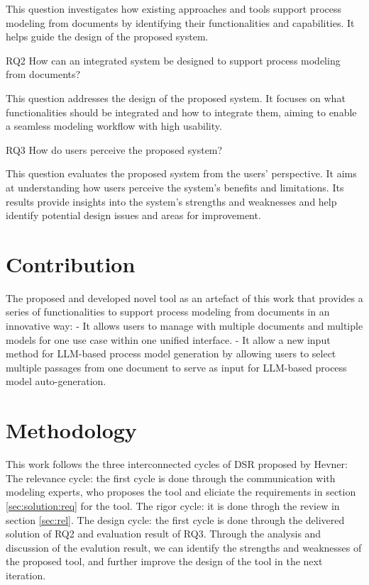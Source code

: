 This question investigates how existing approaches and tools support process modeling from documents by identifying their functionalities and capabilities. It helps guide the design of the proposed system.

RQ2 How can an integrated system be designed to support process modeling from documents?

This question addresses the design of the proposed system. It focuses on what functionalities should be integrated and how to integrate them, aiming to enable a seamless modeling workflow with high usability.

RQ3 How do users perceive the proposed system?

This question evaluates the proposed system from the users’ perspective. It aims at understanding how users perceive the system’s benefits and limitations. Its results provide insights into the system’s strengths and weaknesses and help identify potential design issues and areas for improvement.


\section{Contribution}
\label{sec:intro:con}
The proposed and developed novel tool as an artefact of this work that provides a series of functionalities to support process modeling from documents in an innovative way:
- It allows users to manage with multiple documents and multiple models for one use case within one unified interface.
- It allow a new input method for LLM-based process model generation by allowing users to select multiple passages from one document to serve as input for LLM-based process model auto-generation.
\section{Methodology}
\label{sec:intro:meth}

This work follows the three interconnected cycles of DSR \cite{hevner2007} proposed by Hevner:
The relevance cycle: the first cycle is done through the communication with modeling experts, who proposes the tool and eliciate the requirements in section \ref{sec:solution:req} for the tool. 
The rigor cycle: it is done throgh the review in section \ref{sec:rel}.
The design cycle: the first cycle is done through the delivered solution of RQ2 and evaluation result of RQ3. Through the analysis and discussion of the evalution result, we can identify the strengths and weaknesses of the proposed tool, and further improve the design of the tool in the next iteration.

